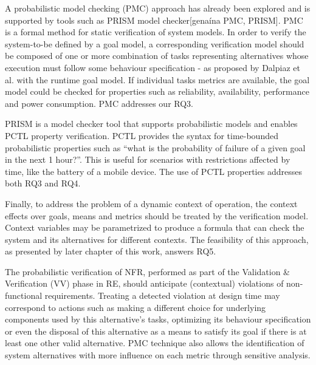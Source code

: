 
A probabilistic model checking (PMC) approach has already been explored and is supported by tools such as PRISM model checker[genaína PMC, PRISM]. PMC is a formal method for static verification of system models. In order to verify the system-to-be defined by a goal model, a corresponding verification model should be composed of one or more combination of tasks representing alternatives whose execution must follow some behaviour specification - as proposed by Dalpiaz et al. with the runtime goal model. If individual tasks metrics are available, the goal model could be checked for properties such as reliability, availability, performance and power consumption. PMC addresses our RQ3.

PRISM is a model checker tool that supports probabilistic models and enables PCTL property verification. PCTL provides the syntax for time-bounded probabilistic properties such as ``what is the probability of failure of a given goal in the next 1 hour?''. This is useful for scenarios with restrictions affected by time, like the battery of a mobile device. The use of PCTL properties addresses both RQ3 and RQ4.


Finally, to address the problem of a dynamic context of operation, the context effects over goals, means and metrics should be treated by the verification model. Context variables may be parametrized to produce a formula that can check the system and its alternatives for different contexts. The feasibility of this approach, as presented by later chapter of this work, answers RQ5. 

The probabilistic verification of NFR, performed as part of the Validation \& Verification (VV) phase in RE, should anticipate (contextual) violations of non-functional requirements. Treating a detected violation at design time may correspond to actions such as making a different choice for underlying components used by this alternative's tasks, optimizing its behaviour specification or even the disposal of this alternative as a means to satisfy its goal if there is at least one other valid alternative. PMC technique also allows the identification of system alternatives with more influence on each metric through sensitive analysis. 


